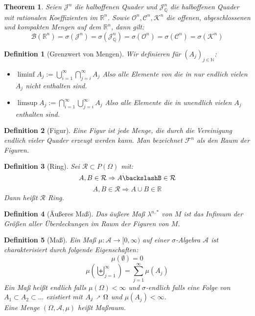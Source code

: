 \documentclass[10pt,a4paper]{article}
\makeatletter
\newtheorem{theorem}{Theorem}
\newtheorem{definition}{Definition}
\newcommand{\fixed@sra}{$\vrule height 2\fontdimen22\textfont2 width 0pt\shortrightarrow$}
\newcommand{\shortarrow}[1]{%
	\mathrel{\text{\rotatebox[origin=c]{\numexpr#1*45}{\fixed@sra}}}
}
\makeatother
\begin{document}
\begin{theorem}
	Seien $\mathcal{J}^n$ die halboffenen Quader und $\mathcal{J}^n_\mathbb{Q}$ die halboffenen Quader mit rationalen Koeffizienten im $\mathbb{R}^n$. Sowie $\mathcal{O}^n, \mathcal{C}^n, \mathcal{K}^n$ die offenen, abgeschlossenen und kompakten Mengen auf dem $\mathbb{R}^n$, dann gilt:
	$$\mathcal{B}(\mathbb{R}^n) = \sigma(\mathcal{J}^n) = \sigma(\mathcal{J}^n_\mathbb{Q}) = \sigma(\mathcal{O}^n) = \sigma(\mathcal{C}^n) = \sigma(\mathcal{K}^n)$$
\end{theorem}
\begin{definition}[Grenzwert von Mengen]
	Wir definieren für $(A_j)_{j\in \mathbb{N}}$:
	\begin{itemize}
		\item $\liminf A_j := \bigcup_{i=1}^\infty\bigcap_{j=i}^\infty A_j$ Also alle Elemente von die in nur endlich vielen $A_j$ nicht enthalten sind.
		\item $\limsup A_j := \bigcap_{i=1}^\infty \bigcup_{j=i}^\infty A_j$ Also alle Elemente die in unendlich vielen $A_j$ enthalten sind.
	\end{itemize}
\end{definition}
\begin{definition}[Figur]
	Eine Figur ist jede Menge, die durch die Vereinigung endlich vieler Quader erzeugt werden kann. Man bezeichnet $\mathcal{F}^n$ als den Raum der Figuren.
\end{definition}
\begin{definition}[Ring]
	Sei $\mathcal{R} \subset P(\Omega)$ mit:
	$$A, B \in \mathcal{R} \Rightarrow A\backslashB \in \mathcal{R}$$
	$$A, B \in \mathcal{R} \Rightarrow A\cup B \in \mathbb{R}$$
	Dann heißt $\mathcal{R}$ Ring.
\end{definition}
\begin{definition}[Äußeres Maß]
	Das äußere Maß $\lambda^{n, *}$ von $M$ ist das Infimum der Größen aller Überdeckungen im Raum der Figuren von $M$.
\end{definition}
\begin{definition}[Maß]
	Ein Maß $\mu: \mathcal{A} \to [0, \infty)$ auf einer $\sigma$-Algebra $\mathcal{A}$ ist charakterisiert durch folgende Eigenschaften:
	$$\mu(\emptyset) = 0$$
	$$\mu(\biguplus_{j=1}^\infty) = \sum_{j=1}^{\infty}\mu(A_j)$$
	Ein Maß heißt endlich falls $\mu(\Omega) < \infty$ und $\sigma$-endlich falls eine Folge von $A_1 \subset A_2 \subset ...$ existiert mit $A_j \shortarrow{1} \Omega$ und $\mu(A_j) < \infty$.\\
	Eine Menge $(\Omega, \mathcal{A}, \mu)$ heißt Maßraum.
	
\end{definition}
\end{document}
